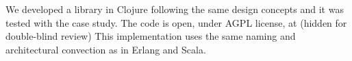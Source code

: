 
We developed a library in Clojure following the same design concepts and it was tested with the case study. The code is open, under AGPL license, at
(hidden for double-blind review)
This implementation uses the same naming and architectural convection as in Erlang and Scala. 